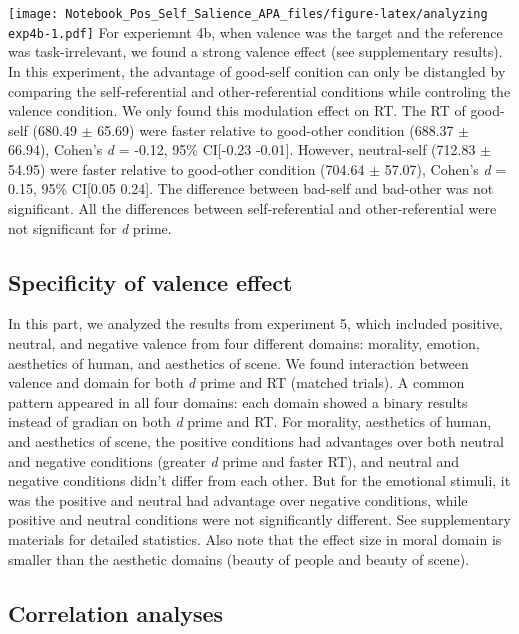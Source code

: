 \documentclass[man]{apa6}
\begin{document}
\texttt{[image: Notebook\_Pos\_Self\_Salience\_APA\_files/figure-latex/analyzing exp4b-1.pdf]}
For experiemnt 4b, when valence was the target and the reference was task-irrelevant, we found a strong valence effect (see supplementary results). In this experiment, the advantage of good-self conition can only be distangled by comparing the self-referential and other-referential conditions while controling the valence condition. We only found this modulation effect on RT. The RT of good-self (680.49 \(\pm\) 65.69) were faster relative to good-other condition (688.37 \(\pm\) 66.94), Cohen's \emph{d} = -0.12, 95\% CI{[}-0.23 -0.01{]}. However, neutral-self (712.83 \(\pm\) 54.95) were faster relative to good-other condition (704.64 \(\pm\) 57.07), Cohen's \emph{d} = 0.15, 95\% CI{[}0.05 0.24{]}. The difference between bad-self and bad-other was not significant. All the differences between self-referential and other-referential were not significant for \emph{d} prime.

\hypertarget{specificity-of-valence-effect}{%
\subsection{Specificity of valence effect}\label{specificity-of-valence-effect}}

In this part, we analyzed the results from experiment 5, which included positive, neutral, and negative valence from four different domains: morality, emotion, aesthetics of human, and aesthetics of scene. We found interaction between valence and domain for both \emph{d} prime and RT (matched trials). A common pattern appeared in all four domains: each domain showed a binary results instead of gradian on both \emph{d} prime and RT. For morality, aesthetics of human, and aesthetics of scene, the positive conditions had advantages over both neutral and negative conditions (greater \emph{d} prime and faster RT), and neutral and negative conditions didn't differ from each other. But for the emotional stimuli, it was the positive and neutral had advantage over negative conditions, while positive and neutral conditions were not significantly different. See supplementary materials for detailed statistics. Also note that the effect size in moral domain is smaller than the aesthetic domains (beauty of people and beauty of scene).

\hypertarget{correlation-analyses}{%
\subsection{Correlation analyses}\label{correlation-analyses}}
\end{document}
